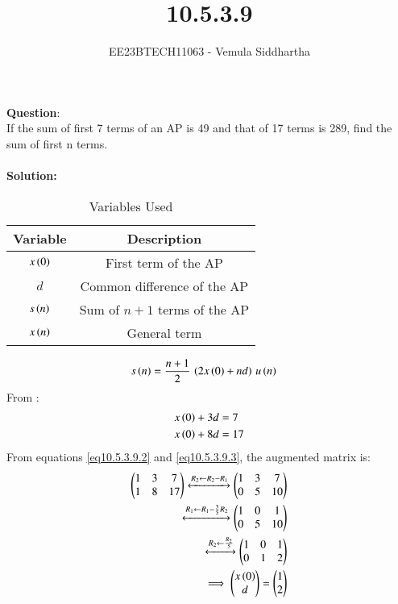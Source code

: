 \documentclass[journal,12pt,twocolumn]{IEEEtran}
\theoremstyle{remark}
\begin{document}

\vspace{3cm}

\title{10.5.3.9}
\author{EE23BTECH11063 - Vemula Siddhartha
}
\maketitle
\newpage
\bigskip

\renewcommand{\thefigure}{\theenumi}
\renewcommand{\thetable}{\theenumi}
\textbf{Question}:\\
If the sum of first 7 terms of an AP is 49 and that of 17 terms is 289, find the sum of
first n terms.
\\\\
\textbf{Solution: }
\begin{table}[h!]    
  \centering
  \begin{tabular}[12pt]{ |c| c|}
  \hline
  \textbf{Variable} & \textbf{Description}\\ 
  \hline
  $x\left(0\right)$ & First term of the AP \\
  \hline 
  $d$ & Common difference of the AP\\
  \hline
  $s\left(n\right)$ & Sum of $n+1$ terms of the AP\\
  \hline
  $x\left(n\right)$ & General term\\
  \hline   
  \end{tabular}
  \caption{Variables Used}
  \label{tab10.5.3.9.1}
\end{table}
\begin{align}
s\left(n\right)&=\frac{n+1}{2}\,\left(2x\left(0\right)+nd\right)\,u\left(n\right)\label{eq10.5.3.9.1}
\end{align}
From :
\begin{align}
x\left(0\right)+3d&=7\label{eq10.5.3.9.2}\\
x\left(0\right)+8d&=17 \label{eq10.5.3.9.3}
\end{align}
From  equations \ref{eq10.5.3.9.2} and \ref{eq10.5.3.9.3}, the augmented matrix is:
\begin{align}
 \begin{pmatrix}
   1 & 3 & 7
   \\
   1 & 8 & 17
 \end{pmatrix}
 \xleftrightarrow[]{R_2 \leftarrow {R_2-R_1}}
 \begin{pmatrix}
   1 & 3 & 7
   \\
   0 & 5 & 10
 \end{pmatrix}
 \\
 \xleftrightarrow[]{R_1 \leftarrow {R_1-\frac{3}{5}R_2}}
 \begin{pmatrix}
   1 & 0 & 1
   \\
   0 & 5 & 10
 \end{pmatrix}
 \\
 \xleftrightarrow[]{R_2 \leftarrow \frac{R_2}{5}}
 \begin{pmatrix}
   1 & 0 & 1
   \\
   0 & 1 & 2
 \end{pmatrix}
 \\
 \implies \begin{pmatrix}
   x\left(0\right)
   \\
   d
 \end{pmatrix}
 =
 \begin{pmatrix}
   1
   \\
   2
 \end{pmatrix}
\end{align}
\end{document}
